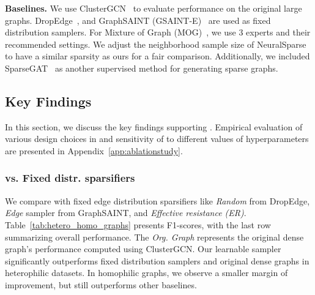 \noindent\textbf{Baselines.} We use ClusterGCN~\cite{chiang2019cluster} to evaluate performance on the original large graphs. DropEdge~\cite{rong2019dropedge}, and GraphSAINT (GSAINT-E)~\cite{zeng2019graphsaint} are used as fixed distribution samplers. For Mixture of Graph (MOG)~\cite{zhang2024graph}, we use $3$ experts and their recommended settings. We adjust the neighborhood sample size of NeuralSparse~\cite{zheng2020robust} to have a similar sparsity as ours for a fair comparison. Additionally, we included SparseGAT~\cite{sparsegat} as another supervised method for generating sparse graphs.

\subsection{Key Findings}
\label{subsec:results}
In this section, we discuss the key findings supporting \sgs. Empirical evaluation of various design choices in \sgs and sensitivity of \sgs to different values of hyperparameters are presented in Appendix~\ref{app:ablationstudy}.

\subsubsection{\sgs vs. Fixed distr. sparsifiers} 
\label{subsubsec:fixedsampler}
We compare \sgs with fixed edge distribution sparsifiers like \textit{Random} from DropEdge, \textit{Edge} sampler from GraphSAINT, and \textit{Effective resistance (ER)}. Table~\ref{tab:hetero_homo_graphs} presents F1-scores, with the last row summarizing overall performance. The \textit{Org. Graph} represents the original dense graph's performance computed using ClusterGCN. Our learnable sampler \edgemlp significantly outperforms fixed distribution samplers and original dense graphs in heterophilic datasets. 
% 
% 
In homophilic graphs, we observe a smaller margin of improvement, but \sgs still outperforms other baselines. 



% 

